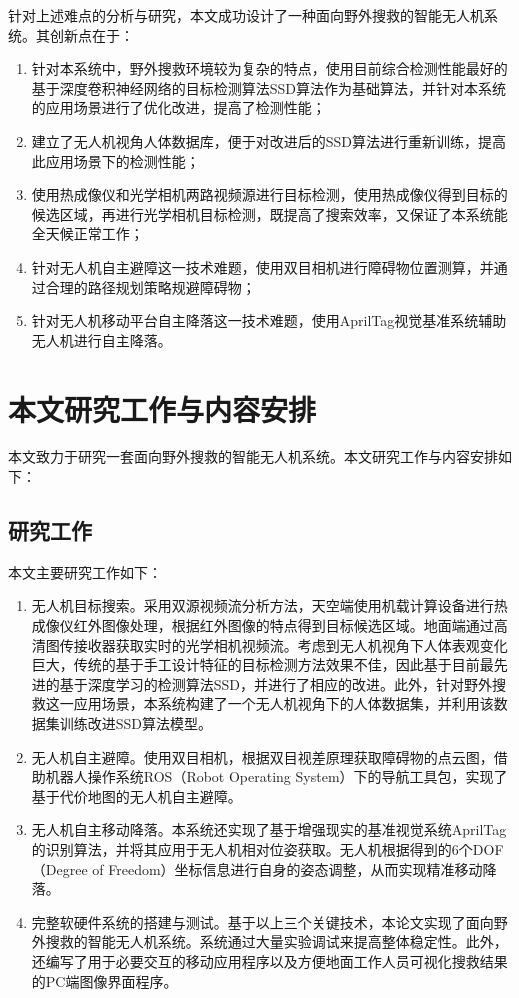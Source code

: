 针对上述难点的分析与研究，本文成功设计了一种面向野外搜救的智能无人机系统。其创新点在于：
\begin{enumerate}[1.]
\item 针对本系统中，野外搜救环境较为复杂的特点，使用目前综合检测性能最好的基于深度卷积神经网络的目标检测算法SSD算法作为基础算法，并针对本系统的应用场景进行了优化改进，提高了检测性能；
\item 建立了无人机视角人体数据库，便于对改进后的SSD算法进行重新训练，提高此应用场景下的检测性能；
\item 使用热成像仪和光学相机两路视频源进行目标检测，使用热成像仪得到目标的候选区域，再进行光学相机目标检测，既提高了搜索效率，又保证了本系统能全天候正常工作；
\item 针对无人机自主避障这一技术难题，使用双目相机进行障碍物位置测算，并通过合理的路径规划策略规避障碍物；
\item 针对无人机移动平台自主降落这一技术难题，使用AprilTag视觉基准系统辅助无人机进行自主降落。
\end{enumerate}

\section{本文研究工作与内容安排}
本文致力于研究一套面向野外搜救的智能无人机系统。本文研究工作与内容安排如下：

\subsection{研究工作}

本文主要研究工作如下：
\begin{enumerate}[1)]
\item 无人机目标搜索。采用双源视频流分析方法，天空端使用机载计算设备进行热成像仪红外图像处理，根据红外图像的特点得到目标候选区域。地面端通过高清图传接收器获取实时的光学相机视频流。考虑到无人机视角下人体表观变化巨大，传统的基于手工设计特征的目标检测方法效果不佳，因此基于目前最先进的基于深度学习的检测算法SSD，并进行了相应的改进。此外，针对野外搜救这一应用场景，本系统构建了一个无人机视角下的人体数据集，并利用该数据集训练改进SSD算法模型。
\item 无人机自主避障。使用双目相机，根据双目视差原理获取障碍物的点云图，借助机器人操作系统ROS（Robot Operating System）下的导航工具包，实现了基于代价地图的无人机自主避障。
\item 无人机自主移动降落。本系统还实现了基于增强现实的基准视觉系统AprilTag的识别算法，并将其应用于无人机相对位姿获取。无人机根据得到的6个DOF（Degree of Freedom）坐标信息进行自身的姿态调整，从而实现精准移动降落。
\item 完整软硬件系统的搭建与测试。基于以上三个关键技术，本论文实现了面向野外搜救的智能无人机系统。系统通过大量实验调试来提高整体稳定性。此外，还编写了用于必要交互的移动应用程序以及方便地面工作人员可视化搜救结果的PC端图像界面程序。
\end{enumerate}

